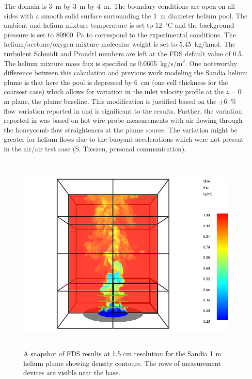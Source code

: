 The domain is 3~m by 3~m by 4~m. The boundary conditions are open on all sides with a smooth solid surface surrounding the 1~m diameter helium pool.  The ambient and helium mixture temperature is set to 12~$^\circ$C and the background pressure is set to 80900~Pa to correspond to the experimental conditions.  The helium/acetone/oxygen mixture molecular weight is set to 5.45~kg/kmol.  The turbulent Schmidt and Prandtl numbers are left at the FDS default value of 0.5.  The helium mixture mass flux is specified as 0.0605~kg/s/m$^2$.  One noteworthy difference between this calculation and previous work modeling the Sandia helium plume \cite{DesJardin:2004} is that here the pool is depressed by 6~cm (one cell thickness for the coarsest case) which allows for variation in the inlet velocity profile at the $z=0$ m plane, the plume baseline.  This modification is justified based on the $\pm 6$~\% flow variation reported in \cite{Blanchat:2001} and is significant to the results.  Further, the variation reported in \cite{Blanchat:2001} was based on hot wire probe measurements with air flowing through the honeycomb flow straighteners at the plume source.  The variation might be greater for helium flows due to the buoyant accelerations which were not present in the air/air test case (S. Tieszen, personal communication).

\begin{figure}[h]
\begin{center}
\includegraphics[height=4in]{FIGURES/Sandia_Plumes/Sandia_He_1m_image}
\caption[Sandia 1~m helium plume image]{A snapshot of FDS results at 1.5 cm resolution for the Sandia 1 m helium plume showing density contours.  The rows of measurement devices are visible near the base.}
\label{Sandia_He_1m_image}
\end{center}
\end{figure}

